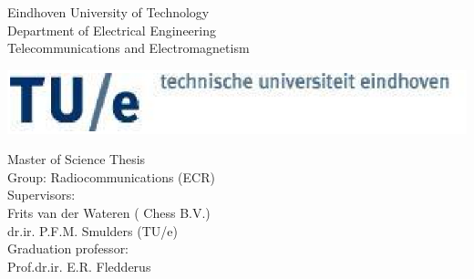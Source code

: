 \documentclass[a4paper,10pt]{report}
\title{\textbf{\begin{LARGE}Decentralized frame synchronization of a TDMA-based wireless sensor network\end{LARGE}}}
\author{Fasika A. Assegei}
\date{August 14, 2008}
\begin{document}
\pagestyle{empty}
\begin{titlepage}
\begin{center}
\parbox{27cm}{
  \hspace{1cm}
  \begin{minipage}[c]{.6\textwidth}
    Eindhoven University of Technology\\
    Department of Electrical Engineering\\
    Telecommunications and Electromagnetism
  \end{minipage}
   \begin{minipage}[c]{.4\textwidth}
    \includegraphics[scale=0.5]{TUElogoCompact2}
  \end{minipage}
}
\end{center}

\begin{center}
\hspace{2cm}
\begin{minipage}[c]{16cm}
    \vspace{2.5cm}
    \centering
    \Large
    \maketitle
    \vspace{4cm}
\end{minipage}
\end{center}
\hspace{1cm}
\begin{minipage}[b]{16cm}
    Master of Science Thesis\\
    Group: Radiocommunications (ECR)\\
    Supervisors:\\
    Frits van der Wateren ( Chess B.V.) \\
    dr.ir. P.F.M. Smulders (TU/e) \\
    Graduation professor:\\
    Prof.dr.ir. E.R. Fledderus
\end{minipage}
\end{titlepage}
\end{document}
